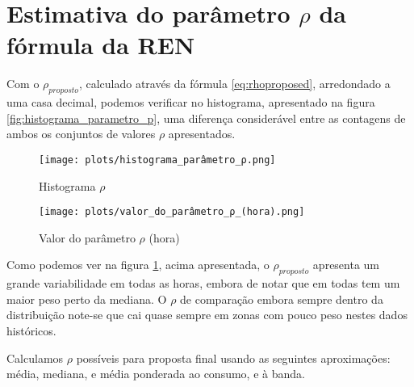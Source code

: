 \section{Estimativa do parâmetro $\rho$ da fórmula da REN}


Com o $\rho_{proposto}$, calculado através da fórmula \ref{eq:rhoproposed}, arredondado a uma casa decimal, podemos verificar no histograma, apresentado na figura \ref{fig:histograma_parametro_p}, uma diferença considerável entre as contagens de ambos os conjuntos de valores $\rho$ apresentados.\par





\begin{figure}[H]
    \centering
    \begin{minipage}[b]{0.49\textwidth}
        \centering
        \texttt{[image: plots/histograma\_parâmetro\_ρ.png]}
        \caption{Histograma $\rho$}
        \label{fig:histograma_parametro_p}
    \end{minipage}
    \begin{minipage}[b]{0.49\textwidth}
        \centering
        \texttt{[image: plots/valor\_do\_parâmetro\_ρ\_(hora).png]}
        \caption{Valor do parâmetro $\rho$ (hora)}
        \label{fig:valor_do_parametro_ρ_hora}
    \end{minipage}
\end{figure}

Como podemos ver na figura \ref{fig:valor_do_parametro_ρ_hora}, acima apresentada, o $\rho_{proposto}$ apresenta um grande variabilidade em todas as horas, embora de notar que em todas tem um maior peso perto da mediana. O $\rho$ de comparação embora sempre dentro da distribuição note-se que cai quase sempre em zonas com pouco peso nestes dados históricos.\par
Calculamos $\rho$ possíveis para proposta final usando as seguintes aproximações: média, mediana, e média ponderada ao consumo, e à banda.\par

